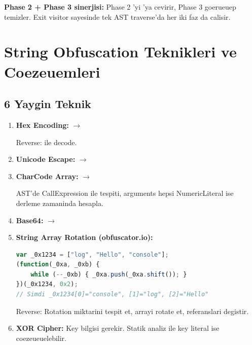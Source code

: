\textbf{Phase 2 + Phase 3 sinerjisi:} Phase 2 'yi 'ya cevirir, Phase 3  goerueuep temizler. Exit visitor sayesinde tek AST traverse'da her iki faz da calisir.


\section{String Obfuscation Teknikleri ve Coezeuemleri}
\label{sec:string-obf}

\subsection{6 Yaygin Teknik}

\begin{enumerate}
\item \textbf{Hex Encoding:}  $\to$ 

Reverse:  ile decode.

\item \textbf{Unicode Escape:}  $\to$ 

\item \textbf{CharCode Array:}  $\to$ 

AST'de CallExpression ile  tespiti, arguments hepsi NumericLiteral ise derleme zamaninda hesapla.

\item \textbf{Base64:}  $\to$ 

\item \textbf{String Array Rotation (obfuscator.io):}
\begin{lstlisting}[language=JavaScript]
var _0x1234 = ["log", "Hello", "console"];
(function(_0xa, _0xb) {
    while (--_0xb) { _0xa.push(_0xa.shift()); }
})(_0x1234, 0x2);
// Simdi _0x1234[0]="console", [1]="log", [2]="Hello"
\end{lstlisting}

Reverse: Rotation miktarini tespit et, arrayi rotate et, referanslari degistir.

\item \textbf{XOR Cipher:} Key bilgisi gerekir. Statik analiz ile key literal ise coezeueuelebilir.
\end{enumerate}

